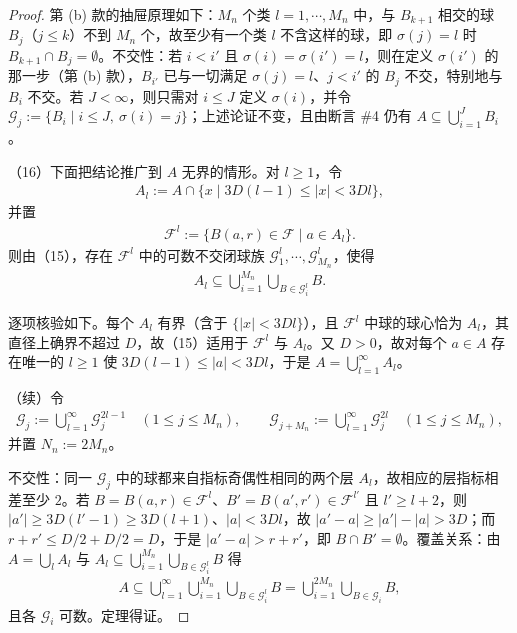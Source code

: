\documentclass[../../main.tex]{subfiles}%
\begin{document}
\begin{proof}
第 (b) 款的抽屉原理如下：$M_n$ 个类 $l=1,\cdots,M_n$ 中，与 $B_{k+1}$ 相交的球 $B_j$（$j\leqslant k$）不到 $M_n$ 个，故至少有一个类 $l$ 不含这样的球，即 $\sigma(j)=l$ 时 $B_{k+1}\cap B_j=\emptyset$。不交性：若 $i<i'$ 且 $\sigma(i)=\sigma(i')=l$，则在定义 $\sigma(i')$ 的那一步（第 (b) 款），$B_{i'}$ 已与一切满足 $\sigma(j)=l$、$j<i'$ 的 $B_j$ 不交，特别地与 $B_i$ 不交。若 $J<\infty$，则只需对 $i\leqslant J$ 定义 $\sigma(i)$，并令 $\mathcal{G}_j:=\{B_i\mid i\leqslant J,\ \sigma(i)=j\}$；上述论证不变，且由断言 \#4 仍有 $A\subseteq\bigcup_{i=1}^{J}B_i$。

（16）下面把结论推广到 $A$ 无界的情形。对 $l\geqslant1$，令
\begin{align*}
A_l:=A\cap\{x\mid 3D(l-1)\leqslant\lvert x\rvert<3Dl\},
\end{align*}
并置
\begin{align*}
\mathcal{F}^{l}:=\{B(a,r)\in\mathcal{F}\mid a\in A_l\}.
\end{align*}
则由（15），存在 $\mathcal{F}^{l}$ 中的可数不交闭球族 $\mathcal{G}^{l}_1,\cdots,\mathcal{G}^{l}_{M_n}$，使得
\begin{align*}
A_l\subseteq\bigcup_{i=1}^{M_n}\bigcup_{B\in\mathcal{G}^{l}_i}B .
\end{align*}

逐项核验如下。每个 $A_l$ 有界（含于 $\{\lvert x\rvert<3Dl\}$），且 $\mathcal{F}^l$ 中球的球心恰为 $A_l$，其直径上确界不超过 $D$，故（15）适用于 $\mathcal{F}^l$ 与 $A_l$。又 $D>0$，故对每个 $a\in A$ 存在唯一的 $l\geqslant1$ 使 $3D(l-1)\leqslant\lvert a\rvert<3Dl$，于是 $A=\bigcup_{l=1}^{\infty}A_l$。

（续）令
\begin{align*}
\mathcal{G}_j:=\bigcup_{l=1}^{\infty}\mathcal{G}^{2l-1}_j\quad(1\leqslant j\leqslant M_n),
\qquad
\mathcal{G}_{j+M_n}:=\bigcup_{l=1}^{\infty}\mathcal{G}^{2l}_j\quad(1\leqslant j\leqslant M_n),
\end{align*}
并置 $N_n:=2M_n$。

不交性：同一 $\mathcal{G}_j$ 中的球都来自指标奇偶性相同的两个层 $A_l$，故相应的层指标相差至少 $2$。若 $B=B(a,r)\in\mathcal{F}^{l}$、$B'=B(a',r')\in\mathcal{F}^{l'}$ 且 $l'\geqslant l+2$，则 $\lvert a'\rvert\geqslant3D(l'-1)\geqslant3D(l+1)$、$\lvert a\rvert<3Dl$，故 $\lvert a'-a\rvert\geqslant\lvert a'\rvert-\lvert a\rvert>3D$；而 $r+r'\leqslant D/2+D/2=D$，于是 $\lvert a'-a\rvert>r+r'$，即 $B\cap B'=\emptyset$。覆盖关系：由 $A=\bigcup_l A_l$ 与 $A_l\subseteq\bigcup_{i=1}^{M_n}\bigcup_{B\in\mathcal{G}^l_i}B$ 得
\begin{align*}
A\subseteq\bigcup_{l=1}^{\infty}\bigcup_{i=1}^{M_n}\bigcup_{B\in\mathcal{G}^{l}_i}B
=\bigcup_{i=1}^{2M_n}\bigcup_{B\in\mathcal{G}_i}B,
\end{align*}
且各 $\mathcal{G}_i$ 可数。定理得证。
\end{proof}
\end{document}
